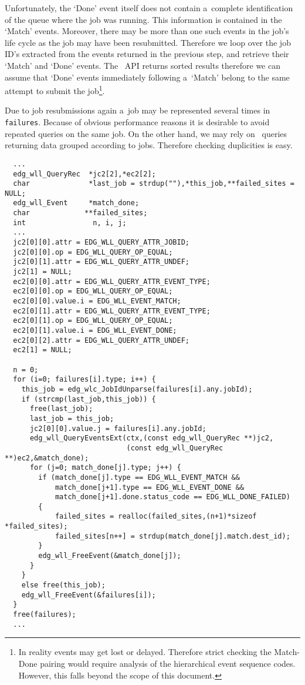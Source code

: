 Unfortunately, the `Done' event itself does not contain a~complete
identification of the queue where the job was running.
This information is contained in the `Match' events.
Moreover, there may be more than one such events in the job's life cycle
as the job may have been resubmitted.
Therefore we loop over the job ID's extracted from the events returned
in the previous step, and retrieve their `Match' and `Done' events.
The \LB\ API returns sorted results therefore we can assume that `Done'
events immediately following a~`Match' belong to the same attempt to submit
the job\footnote{In reality events may get lost or delayed.
Therefore strict checking the Match-Done pairing would require analysis
of the hierarchical event sequence codes.
However, this falls beyond the scope of this document.}.

Due to job resubmissions again
a~job may be represented several times in \verb'failures'.
Because of obvious performance reasons 
it is desirable to avoid repeated queries on the same job.
On the other hand, we may rely on \LB\ queries returning data grouped
according to jobs. Therefore checking duplicities is easy.

\begin{verbatim}
  ...
  edg_wll_QueryRec  *jc2[2],*ec2[2];
  char              *last_job = strdup(""),*this_job,**failed_sites = NULL;
  edg_wll_Event     *match_done;
  char             **failed_sites;
  int                n, i, j;
  ...
  jc2[0][0].attr = EDG_WLL_QUERY_ATTR_JOBID;
  jc2[0][0].op = EDG_WLL_QUERY_OP_EQUAL;
  jc2[0][1].attr = EDG_WLL_QUERY_ATTR_UNDEF;
  jc2[1] = NULL;
  ec2[0][0].attr = EDG_WLL_QUERY_ATTR_EVENT_TYPE;
  ec2[0][0].op = EDG_WLL_QUERY_OP_EQUAL;
  ec2[0][0].value.i = EDG_WLL_EVENT_MATCH;
  ec2[0][1].attr = EDG_WLL_QUERY_ATTR_EVENT_TYPE;
  ec2[0][1].op = EDG_WLL_QUERY_OP_EQUAL;
  ec2[0][1].value.i = EDG_WLL_EVENT_DONE;
  ec2[0][2].attr = EDG_WLL_QUERY_ATTR_UNDEF;
  ec2[1] = NULL;
  
  n = 0;
  for (i=0; failures[i].type; i++) {
    this_job = edg_wlc_JobIdUnparse(failures[i].any.jobId);
    if (strcmp(last_job,this_job)) {
      free(last_job);
      last_job = this_job;
      jc2[0][0].value.j = failures[i].any.jobId;
      edg_wll_QueryEventsExt(ctx,(const edg_wll_QueryRec **)jc2,
                             (const edg_wll_QueryRec **)ec2,&match_done);
      for (j=0; match_done[j].type; j++) {
        if (match_done[j].type == EDG_WLL_EVENT_MATCH &&
            match_done[j+1].type == EDG_WLL_EVENT_DONE &&
            match_done[j+1].done.status_code == EDG_WLL_DONE_FAILED)
        {
            failed_sites = realloc(failed_sites,(n+1)*sizeof *failed_sites);
            failed_sites[n++] = strdup(match_done[j].match.dest_id);
        }
        edg_wll_FreeEvent(&match_done[j]);
      }
    }
    else free(this_job);
    edg_wll_FreeEvent(&failures[i]);
  }
  free(failures);
  ...
\end{verbatim}

